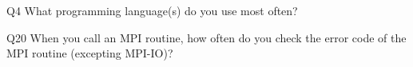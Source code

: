 \begin{description}%
\item{Q4} What programming language(s) do you use most often?%
\item{Q20} When you call an MPI routine, how often do you check the error code of the MPI routine  (excepting MPI-IO)?%
\end{description}%
